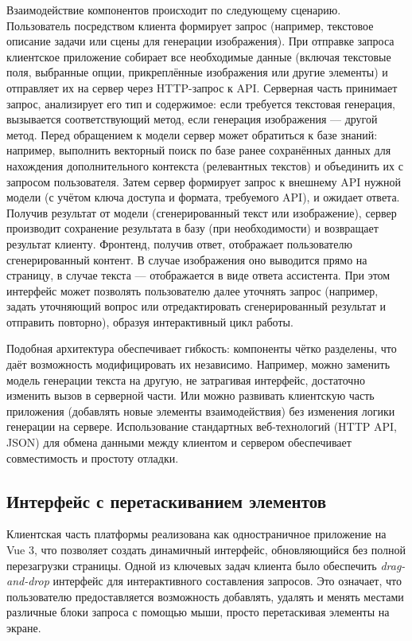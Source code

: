 Взаимодействие компонентов происходит по следующему сценарию. Пользователь посредством клиента формирует запрос (например, текстовое описание задачи или сцены для генерации изображения). При отправке запроса клиентское приложение собирает все необходимые данные (включая текстовые поля, выбранные опции, прикреплённые изображения или другие элементы) и отправляет их на сервер через HTTP-запрос к API. Серверная часть принимает запрос, анализирует его тип и содержимое: если требуется текстовая генерация, вызывается соответствующий метод, если генерация изображения — другой метод. Перед обращением к модели сервер может обратиться к базе знаний: например, выполнить векторный поиск по базе ранее сохранённых данных для нахождения дополнительного контекста (релевантных текстов) и объединить их с запросом пользователя. Затем сервер формирует запрос к внешнему API нужной модели (с учётом ключа доступа и формата, требуемого API), и ожидает ответа. Получив результат от модели (сгенерированный текст или изображение), сервер производит сохранение результата в базу (при необходимости) и возвращает результат клиенту. Фронтенд, получив ответ, отображает пользователю сгенерированный контент. В случае изображения оно выводится прямо на страницу, в случае текста — отображается в виде ответа ассистента. При этом интерфейс может позволять пользователю далее уточнять запрос (например, задать уточняющий вопрос или отредактировать сгенерированный результат и отправить повторно), образуя интерактивный цикл работы.

Подобная архитектура обеспечивает гибкость: компоненты чётко разделены, что даёт возможность модифицировать их независимо. Например, можно заменить модель генерации текста на другую, не затрагивая интерфейс, достаточно изменить вызов в серверной части. Или можно развивать клиентскую часть приложения (добавлять новые элементы взаимодействия) без изменения логики генерации на сервере. Использование стандартных веб-технологий (HTTP API, JSON) для обмена данными между клиентом и сервером обеспечивает совместимость и простоту отладки.

\subsection{Интерфейс с перетаскиванием элементов}

Клиентская часть платформы реализована как одностраничное приложение на Vue 3, что позволяет создать динамичный интерфейс, обновляющийся без полной перезагрузки страницы. Одной из ключевых задач клиента было обеспечить \textit{drag-and-drop} интерфейс для интерактивного составления запросов. Это означает, что пользователю предоставляется возможность добавлять, удалять и менять местами различные блоки запроса с помощью мыши, просто перетаскивая элементы на экране.

